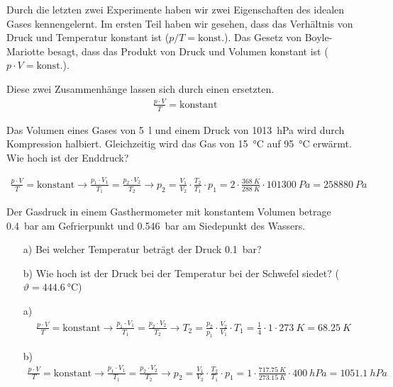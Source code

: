 Durch die letzten zwei Experimente haben wir zwei Eigenschaften des idealen Gases kennengelernt.
Im ersten Teil haben wir gesehen, dass das Verhältnis von Druck und Temperatur konstant ist ($p/T =\text{konst.}$).
Das Gesetz von Boyle-Mariotte besagt, dass das Produkt von Druck und Volumen konstant ist ($p\cdot V =\text{konst.}$).

Diese zwei Zusammenhänge lassen sich durch einen ersetzten.
\begin{eqnarray*}
	\frac{p\cdot V}{T} = \text{konstant}
\end{eqnarray*}

\begin{aufgabe}
	Das Volumen eines Gases von \SI{5}{l} und einem Druck von \SI{1013}{hPa} wird durch Kompression halbiert. 
	Gleichzeitig wird das Gas von \SI{15}{\celsius} auf \SI{95}{\celsius} erwärmt. 
	Wie hoch ist der Enddruck?
	\begin{loesung}
		\begin{eqnarray*}
			\frac{p\cdot V}{T}=\text{konstant}\to \frac{p_1\cdot V_1}{T_1}=\frac{p_2\cdot V_2}{T_2}\to p_2 =\frac{V_1}{V_2}\cdot\frac{T_2}{T_1}\cdot p_1=\num{2}\cdot\frac{\SI{368}{K}}{\SI{288}{K}}\cdot\SI{101300}{Pa}=\SI{258880}{Pa}
		\end{eqnarray*}
	\end{loesung}
\end{aufgabe}

\begin{aufgabe}
	Der Gasdruck in einem Gasthermometer mit konstantem Volumen betrage \SI{0.4}{bar} am Gefrierpunkt
	und \SI{0.546}{bar} am Siedepunkt des Wassers.
	\begin{itemize}
		\item [a)] Bei welcher Temperatur beträgt der Druck \SI{0.1}{bar}?
		\item [b)] Wie hoch ist der Druck bei der Temperatur bei der Schwefel siedet? ($\vartheta=\SI{444.6}{\celsius}$)
	\end{itemize}
	\begin{loesung}
		\begin{itemize}
			\item [a)]
				\begin{eqnarray*}
					\frac{p\cdot V}{T}=\text{konstant}\to\frac{p_1\cdot V_1}{T_1}=\frac{p_2\cdot V_2}{T_2}\to T_2=\frac{p_2}{p_1}\cdot\frac{V_2}{V_1}\cdot T_1 =\frac{1}{4}\cdot 1\cdot \SI{273}{K}=\SI{68.25}{K} 
				\end{eqnarray*}
			\item[b)]
				\begin{eqnarray*}
					\frac{p\cdot V}{T}=\text{konstant}\to\frac{p_1\cdot V_1}{T_1}=\frac{p_2\cdot V_2}{T_2}\to p_2=\frac{V_1}{V_2}\cdot\frac{T_2}{T_1}\cdot p_1=1\cdot\frac{\SI{717.75}{K}}{\SI{273.15}{K}}\cdot\SI{400}{hPa}=\SI{1051.1}{hPa} 
				\end{eqnarray*}
		\end{itemize}
	\end{loesung}
\end{aufgabe}

